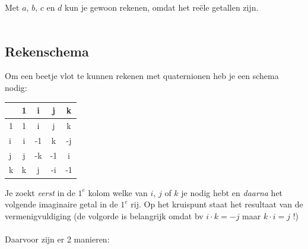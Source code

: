 Met $a$, $b$, $c$ en $d$ kun je gewoon rekenen, omdat het reële getallen zijn.\\ \\

\newpage
\subsection{Rekenschema}
Om een beetje vlot te kunnen rekenen met quaternionen heb je een schema nodig:
\begin{center}
	\begin{tabular}{ | l || c | c |c |c |}
		\hline
		& 1 & i & j & k \\ \hline \hline
		1 & 1 & i & j & k \\ \hline
		i & i & -1 & k & -j\\ \hline
		j & j & -k & -1 & i\\ \hline
		k & k & j & -i & -1\\ 
		\hline 
	\end{tabular}
\end{center}

Je zoekt \textit{eerst} in de $ 1^e $ kolom welke van $i$, $j$ of $k$ je nodig hebt en \textit{daarna} het volgende  imaginaire getal in de $ 1^e $ rij.  Op het kruispunt staat het resultaat van de vermenigvuldiging (de volgorde is belangrijk omdat bv $  i\cdot k = -j $ maar $ k\cdot i = j  $ !) \\ \\
Daarvoor zijn er 2 manieren:\\


